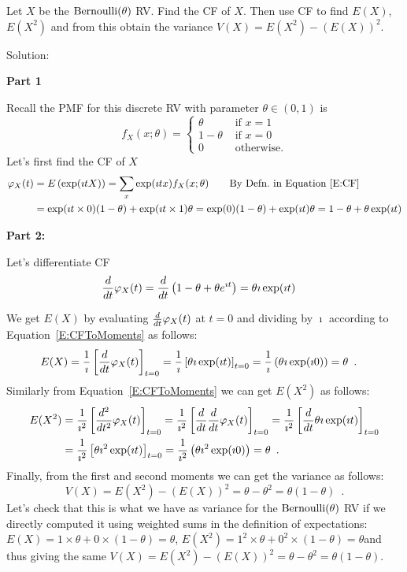 \begin{example}\label{EgCFOfBernoulli}
Let $X$ be the $\mbox{{\rm Bernoulli}}(\theta)$ RV.  
Find the CF of $X$.   
Then use CF to find $E(X)$, $E(X^2)$ and from this obtain the variance $V(X) = E(X^2)-(E(X))^2$.

Solution: 

{\bf Part 1}

Recall the PMF for this discrete RV with parameter $\theta \in (0,1)$ is
\[
f_X(x;\theta) = 
\begin{cases}
\theta & \text{ if } x = 1\\
1-\theta & \text{ if } x = 0\\
0 & \text{ otherwise}.
\end{cases}
\]
Let's first find the CF of $X$
\begin{align*}
\varphi_X(t)
&= E \left( \exp(\imath t X) \right) 
= \sum_x  \exp(\imath t x) f_X(x;\theta) \qquad \text{By Defn.~in Equation~\eqref{E:CF}}\\
&= \exp(\imath t \times 0) (1-\theta) + \exp(\imath t \times 1) \theta 
= \exp(0) (1-\theta) + \exp(\imath t) \theta 
=  1-\theta + \theta \exp(\imath t)  
\end{align*}

{\bf Part 2:}

Let's differentiate CF 
\begin{align*}
\frac{d}{dt}\varphi_X(t)
&= \frac{d}{dt}\left(1-\theta + \theta e^{\imath t} \right) 
=  \theta \imath \exp(\imath t)
\end{align*}

We get $E(X)$ by evaluating $\frac{d}{dt}\varphi_X(t)$ at $t=0$ and dividing by $\imath$ according to Equation~\eqref{E:CFToMoments} as follows:
\begin{align*}
E(X)
&= \frac{1}{\imath} \left[ \frac{d}{dt}\varphi_X(t) \right]_{t=0} 
= \frac{1}{\imath} \left[ \theta \imath \exp(\imath t) \right]_{t=0} 
= \frac{1}{\imath} \left( \theta \imath \exp(\imath 0) \right) 
=  \theta \enspace.
\end{align*}
Similarly from Equation~\eqref{E:CFToMoments} we can get $E(X^2)$ as follows:
\begin{align*}
E(X^2)
&= \frac{1}{\imath^2} \left[ \frac{d^2}{dt^2}\varphi_X(t) \right]_{t=0} 
= \frac{1}{\imath^2} \left[ \frac{d}{dt} \frac{d}{dt} \varphi_X(t) \right]_{t=0} 
= \frac{1}{\imath^2} \left[ \frac{d}{dt} \theta \imath \exp(\imath t) \right]_{t=0}\\ 
&= \frac{1}{\imath^2} \left[ \theta \imath^2 \exp(\imath t) \right]_{t=0} 
= \frac{1}{\imath^2} \left( \theta \imath^2 \exp(\imath 0) \right) 
=  \theta \enspace.
\end{align*}
Finally, from the first and second moments we can get the variance as follows:
\[
V(X) = E(X^2) - (E(X))^2 = \theta - \theta^2 = \theta(1-\theta) \enspace .
\]
Let's check that this is what we have as variance for the $\mbox{{\rm Bernoulli}}(\theta)$ RV if we directly computed it using weighted sums in the definition of expectations: $E(X)=1 \times \theta + 0 \times (1-\theta)=\theta$, $E(X^2) = 1^2 \times \theta + 0^2 \times (1-\theta)=\theta$and thus giving the same $V(X) = E(X^2) - (E(X))^2 = \theta - \theta^2 = \theta(1-\theta)$.
\end{example}


